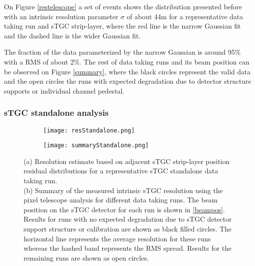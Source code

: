 On Figure \ref{restelescope} a set of events shows the distribution presented before with an intrinsic resolution
parameter $\sigma$ of about \unit{44}{\micro m} for a representative data taking run and sTGC strip-layer, where the red
line is the narrow Gaussian fit and the dashed line is the wider Gaussian fit.\par

The fraction of the data parameterized by the narrow Gaussian is around 95\% with a RMS of about 2\%.
The rest of data taking runs and its beam position can be observed on Figure \ref{summary}, where the black circles
represent the valid data and the open circles the runs with expected degradation due to detector structure supports or
individual channel pedestal.\par






\subsubsection{sTGC standalone analysis}
\begin{figure}[b]
\centering
\hspace*{\fill}
\begin{subfigure}[b]{0.45\textwidth}
\centering
\texttt{[image: resStandalone.png]}
\caption{}\label{pairwise}
\end{subfigure}
\begin{subfigure}[b]{0.45\textwidth}
\centering
\texttt{[image: summaryStandalone.png]}
\caption{}\label{sss}
\end{subfigure}
\hspace*{\fill}
\caption{(a) Resolution estimate based on adjacent sTGC strip-layer position residual distributions for a
representative sTGC standalone data taking run.\\
(b) Summary of the measured intrinsic sTGC resolution using the
pixel telescope analysis for different data taking runs. The beam position on the sTGC detector for each run is
shown in \ref{beampos}. Results for runs with no expected degradation due to sTGC detector support structure or
calibration are shown as black filled circles. The horizontal line represents the average resolution for these runs
whereas the hashed band represents the RMS spread.  Results for the remaining runs are shown as open circles. }\label{}

\end{figure}

